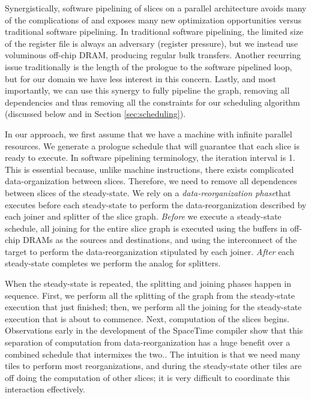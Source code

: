 Synergistically, software pipelining of slices on a parallel
architecture avoids many of the complications of and exposes many new
optimization opportunities versus traditional software pipelining.  In
traditional software pipelining, the limited size of the register file
is always an adversary (register pressure), but we instead use
voluminous off-chip DRAM, producing regular bulk transfers.  Another
recurring issue traditionally is the length of the prologue to the
software pipelined loop, but for our domain we have less interest in
this concern.  Lastly, and most importantly, we can use this synergy
to fully pipeline the graph, removing all dependencies and thus
removing all the constraints for our scheduling algorithm (discussed
below and in Section \ref{sec:scheduling}).

In our approach, we first assume that we have a machine with infinite
parallel resources.  We generate a prologue schedule that will
guarantee that each slice is ready to execute.  In software pipelining
terminology, the iteration interval is 1.  This is essential because,
unlike machine instructions, there exists complicated
data-organization between slices.  Therefore, we need to remove all
dependences between slices of the steady-state.  We rely on a {\it
data-reorganization phase}that executes before each steady-state to
perform the data-reorganization described by each joiner and splitter
of the slice graph.  {\it Before} we execute a steady-state schedule,
all joining for the entire slice graph is executed using the buffers
in off-chip DRAMs as the sources and destinations, and using the
interconnect of the target to perform the data-reorganization
stipulated by each joiner.  {\it After} each steady-state completes we
perform the analog for splitters.

When the steady-state is repeated, the splitting and joining phases
happen in sequence.  First, we perform all the splitting of the graph
from the steady-state execution that just finished; then, we perform
all the joining for the steady-state execution that is about to
commence. Next, computation of the slices begins.  Observations early
in the development of the SpaceTime compiler show that this separation
of computation from data-reorganization has a huge benefit over a
combined schedule that intermixes the two..  The intuition is that we
need many tiles to perform most reorganizations, and during the
steady-state other tiles are off doing the computation of other
slices; it is very difficult to coordinate this interaction
effectively.

